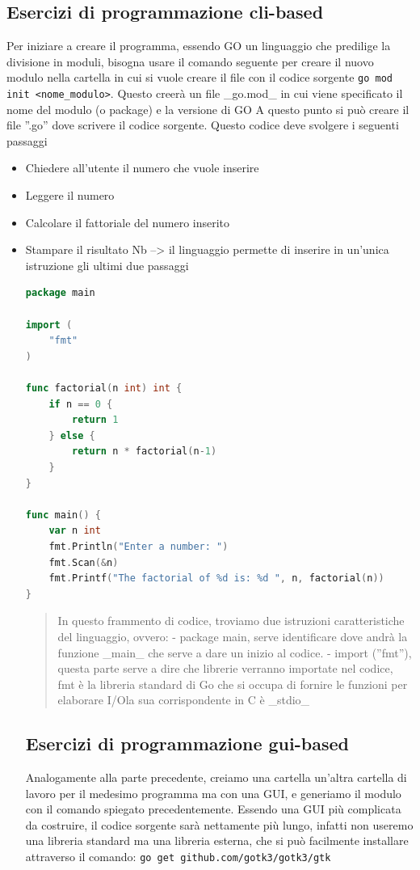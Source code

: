 \subsection{Esercizi di programmazione cli-based}
Per iniziare a creare il programma, essendo GO un linguaggio che predilige la divisione in moduli, bisogna usare il comando seguente per creare il nuovo modulo nella cartella in cui si vuole creare il file con il codice sorgente \texttt{go mod init <nome\_modulo>}.\newline 
Questo creerà un file _go.mod_ in cui viene specificato il nome del modulo (o package) e la versione di GO\@
A questo punto si può creare il file ''.go'' dove scrivere il codice sorgente.
Questo codice deve svolgere i seguenti passaggi
\begin{itemize}
\item Chiedere all'utente il numero che vuole inserire
\item Leggere il numero
\item Calcolare il fattoriale del numero inserito
\item Stampare il risultato
Nb --> il linguaggio permette di inserire in un'unica istruzione gli ultimi due passaggi
\begin{lstlisting}[language=Go]
package main

import (
	"fmt"
)

func factorial(n int) int {
	if n == 0 {
		return 1
	} else {
		return n * factorial(n-1)
	}
}

func main() {
	var n int
	fmt.Println("Enter a number: ")
	fmt.Scan(&n)
	fmt.Printf("The factorial of %d is: %d ", n, factorial(n))
}
\end{lstlisting}
\begin{quote}
In questo frammento di codice, troviamo due istruzioni caratteristiche del linguaggio, ovvero:
- package main, serve identificare dove andrà la funzione _main_ che serve a dare un inizio al codice.
- import (''fmt''), questa parte serve a dire che librerie verranno importate nel codice, fmt è la libreria standard di Go che si occupa di fornire le funzioni per elaborare I/O\@ la sua corrispondente in C è _stdio_

\end{quote}
\newpage
\subsection{Esercizi di programmazione gui-based}
Analogamente alla parte precedente, creiamo una cartella un'altra cartella di lavoro per il medesimo programma ma con una GUI, e generiamo il modulo con il comando spiegato precedentemente. Essendo una GUI più complicata da costruire, il codice sorgente sarà nettamente più lungo, infatti non useremo una libreria standard ma una libreria esterna, che si può facilmente installare attraverso il comando:
\texttt{go get github.com/gotk3/gotk3/gtk} \newline


\end{itemize}
